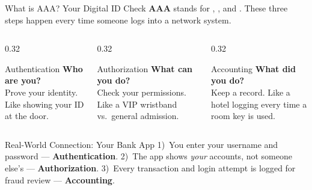 \documentclass[aspectratio=169]{beamer}  %
\begin{document}
\begin{frame}{What is AAA? Your Digital ID Check}
    \footnotesize
    \textbf{AAA} stands for , , and .
    These three steps happen every time someone logs into a network system.

    \vspace{0.5em}
    \begin{columns}[T]
        \begin{column}{0.32\textwidth}
            \begin{block}{Authentication}
                \footnotesize
                \textbf{Who are you?}\\[0.3em]
                Prove your identity. Like showing your ID at the door.
            \end{block}
        \end{column}
        \begin{column}{0.32\textwidth}
            \begin{block}{Authorization}
                \footnotesize
                \textbf{What can you do?}\\[0.3em]
                Check your permissions. Like a VIP wristband vs.\ general admission.
            \end{block}
        \end{column}
        \begin{column}{0.32\textwidth}
            \begin{block}{Accounting}
                \footnotesize
                \textbf{What did you do?}\\[0.3em]
                Keep a record. Like a hotel logging every time a room key is used.
            \end{block}
        \end{column}
    \end{columns}

    \vspace{0.5em}
    \begin{exampleblock}{Real-World Connection: Your Bank App}
        \footnotesize
        1)~You enter your username and password --- \textbf{Authentication}.
        2)~The app shows \emph{your} accounts, not someone else's --- \textbf{Authorization}.
        3)~Every transaction and login attempt is logged for fraud review --- \textbf{Accounting}.
    \end{exampleblock}
\end{frame}
\end{document}
